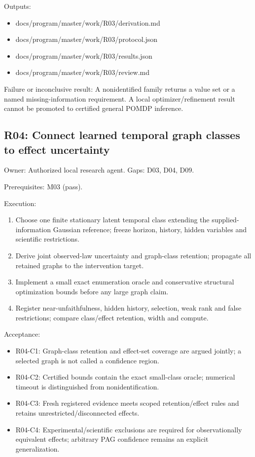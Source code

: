 \documentclass[
  11pt,
  a4paper,
]{article}
\providecommand{\tightlist}{%
  \setlength{\itemsep}{0pt}\setlength{\parskip}{0pt}}
\begin{document}
Outputs:

\begin{itemize}
\tightlist
\item
  docs/program/master/work/R03/derivation.md
\item
  docs/program/master/work/R03/protocol.json
\item
  docs/program/master/work/R03/results.json
\item
  docs/program/master/work/R03/review.md
\end{itemize}

Failure or inconclusive result: A nonidentified family returns a value
set or a named missing-information requirement. A local
optimizer/refinement result cannot be promoted to certified general
POMDP inference.

\hypertarget{r04-connect-learned-temporal-graph-classes-to-effect-uncertainty}{%
\subsection{R04: Connect learned temporal graph classes to effect
uncertainty}\label{r04-connect-learned-temporal-graph-classes-to-effect-uncertainty}}

Owner: Authorized local research agent. Gaps: D03, D04, D09.

Prerequisites: M03 (pass).

Execution:

\begin{enumerate}
\def\labelenumi{\arabic{enumi}.}
\tightlist
\item
  Choose one finite stationary latent temporal class extending the
  supplied-information Gaussian reference; freeze horizon, history,
  hidden variables and scientific restrictions.
\item
  Derive joint observed-law uncertainty and graph-class retention;
  propagate all retained graphs to the intervention target.
\item
  Implement a small exact enumeration oracle and conservative structural
  optimization bounds before any large graph claim.
\item
  Register near-unfaithfulness, hidden history, selection, weak rank and
  false restrictions; compare class/effect retention, width and compute.
\end{enumerate}

Acceptance:

\begin{itemize}
\tightlist
\item
  R04-C1: Graph-class retention and effect-set coverage are argued
  jointly; a selected graph is not called a confidence region.
\item
  R04-C2: Certified bounds contain the exact small-class oracle;
  numerical timeout is distinguished from nonidentification.
\item
  R04-C3: Fresh registered evidence meets scoped retention/effect rules
  and retains unrestricted/disconnected effects.
\item
  R04-C4: Experimental/scientific exclusions are required for
  observationally equivalent effects; arbitrary PAG confidence remains
  an explicit generalization.
\end{itemize}
\end{document}
